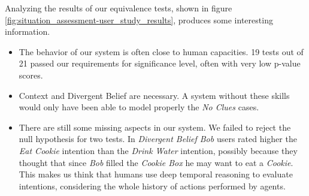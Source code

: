 Analyzing the results of our equivalence tests, shown in figure \ref{fig:situation_assessment-user_study_results}, produces some interesting information.
\begin{itemize}
\item The behavior of our system is often close to human capacities. 19 tests out of 21 passed our requirements for significance level, often with very low p-value scores. 
\item Context and Divergent Belief are necessary. A system without these skills would only have been able to model properly the \textit{No Clues} cases. 
\item There are still some missing aspects in our system. We failed to reject the null hypothesis for two tests. In \textit{Divergent Belief Bob} users rated higher the \textit{Eat Cookie} intention than the \textit{Drink Water} intention, possibly because they thought that since \textit{Bob} filled the \textit{Cookie Box} he may want to eat a \textit{Cookie}. This makes us think that humans use deep temporal reasoning to evaluate intentions, considering the whole history of actions performed by agents.  
\end{itemize}
